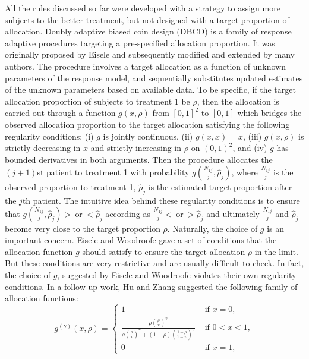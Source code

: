 All the rules discussed so far were developed with a strategy to assign
more subjects to the better treatment, but not designed with a target proportion of allocation. Doubly adaptive biased coin design (DBCD) is
a family of response adaptive procedures targeting a pre-specified
allocation proportion. It was originally proposed by Eisele\cite{34}
and subsequently modified and extended by many authors\cite{35,36}. The procedure involves a target allocation as a function of unknown parameters of the response model, and sequentially substitutes updated estimates of the unknown parameters based on available data. To be specific, if the target allocation proportion of subjects to treatment 1 be $\rho$, then the
allocation is carried out through a function $g(x,\rho)$ from $[0,1]^2$
to $[0,1]$ which bridges the observed allocation proportion to the
target allocation satisfying the following regularity conditions:
(i) $g$ is jointly continuous, (ii) $g(x,x)=x$, (iii) $g(x,\rho)$ is
strictly decreasing in $x$ and strictly increasing in $\rho$ on
$(0,1)^2$, and (iv) $g$ has bounded derivatives in both arguments.
Then the procedure allocates the $(j+1)$st patient to treatment 1
with probability $g(\frac{N_{1j}}{j},\widehat{\rho}_j)$, where
$\frac{N_{1j}}{j}$ is the observed proportion to treatment 1,
$\widehat{\rho}_j$ is the estimated target proportion after the
$j$th patient. The intuitive idea behind these regularity conditions is to ensure that $g(\frac{N_{1j}}{j},\widehat{\rho}_j)> ~\mbox{or}~ <\widehat{\rho}_j$ according as $\frac{N_{1j}}{j}<~\mbox{or}~>\widehat{\rho}_j$ and ultimately $\frac{N_{1j}}{j}$ and $\widehat{\rho}_j$ become very close to the target proportion $\rho$.  Naturally, the choice of $g$ is an important concern. Eisele and Woodroofe\cite{35} gave a set of conditions that the allocation function $g$ should satisfy to ensure the target allocation $\rho$ in the limit. But these
conditions are very restrictive and are usually difficult to check.
In fact, the choice of $g$, suggested by  Eisele and Woodroofe\cite{35}  violates their own regularity conditions\cite{37}. In a follow up work, Hu and Zhang\cite{36} suggested the following family of allocation functions:
\[g^{(\gamma)}(x,\rho) = \left\{
\begin{array}{ll}
1& \mbox{~if~} x=0,\\
\frac{\rho(\frac{\rho}{x})^{\gamma}}{\rho(\frac{\rho}{x})^{\gamma}+(1-\rho)(\frac{1-\rho}{1-x})^{\gamma}} & \mbox{~if~} 0<x<1,\\
0& \mbox{~if~} x=1,
\end{array}
\right. \]
